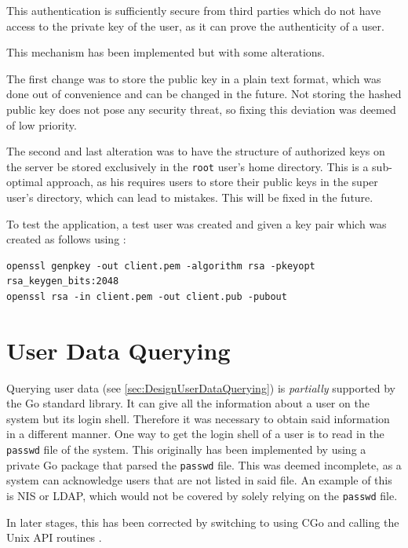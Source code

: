 \documentclass[10pt,a4paper,titlepage,twoside,english,final]{zhawreprt}
\begin{document}
This authentication is sufficiently secure from third parties which do not have access to the private key of the user, as it can prove the authenticity of a user.

This mechanism has been implemented but with some alterations.

The first change was to store the public key in a plain text format, which was done out of convenience and can be changed in the future.
Not storing the hashed public key does not pose any security threat, so fixing this deviation was deemed of low priority.

The second and last alteration was to have the structure of authorized keys on the server be stored exclusively in the \texttt{root} user's home directory.
This is a sub-optimal approach, as his requires users to store their public keys in the super user's directory, which can lead to mistakes.
This will be fixed in the future.

To test the application, a test user was created and given a key pair which was created as follows using \cite{openssl}:

\setlistingBash
\begin{lstlisting}[caption={Generating a key pair for the client},label=lst:GenClientKeyPair,deletekeywords={in}]
openssl genpkey -out client.pem -algorithm rsa -pkeyopt rsa_keygen_bits:2048
openssl rsa -in client.pem -out client.pub -pubout
\end{lstlisting}

\section{User Data Querying}\label{sec:ImplUserDataQuerying}
Querying user data (see \ref{sec:DesignUserDataQuerying}) is \textit{partially} supported by the \gls{Go} standard library.
It can give all the information about a user on the system but its \gls{login} \gls{shell}.
Therefore it was necessary to obtain said information in a different manner.
One way to get the \gls{login} \gls{shell} of a user is to read in the \texttt{passwd} file of the system.
This originally has been implemented by using a private \gls{Go} package that parsed the \texttt{passwd} file.
This was deemed incomplete, as a system can acknowledge users that are not listed in said file.
An example of this is \gls{NIS} or \gls{LDAP}, which would not be covered by solely relying on the \texttt{passwd} file.

In later stages, this has been corrected by switching to using \gls{CGo} and calling the \gls{Unix} \gls{API} routines \cite{getpw}.
\end{document}
